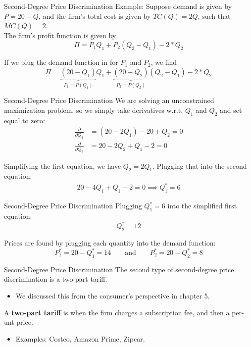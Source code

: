 \documentclass{beamer}
\begin{document}
\begin{frame}{Second-Degree Price Discrimination}
  Example: Suppose demand is given by $P = 20 - Q$, and the firm's total cost is given by $TC(Q)=2Q$, such that $MC(Q)=2$.\\

  The firm's profit function is given by
  $$
    \Pi = P_1 Q_1 + P_2 (Q_2 - Q_1) - 2 * Q_2
  $$

  If we plug the demand function in for $P_1$ and $P_2$, we find
  $$
    \Pi = \underbrace{(20 - Q_1)}_{P_1 = P(Q_1)} Q_1 + \underbrace{(20 - Q_2)}_{P_2 = P(Q_2)} (Q_2 - Q_1) - 2 * Q_2
  $$
\end{frame}

\begin{frame}{Second-Degree Price Discrimination}
  We are solving an unconstrained maximization problem, so we simply take derivatives w.r.t. $Q_1$ and $Q_2$ and set equal to zero:
  \begin{align*}
    \frac{\partial}{\partial Q_1} & = (20 - 2Q_1) - 20 + Q_2 = 0 \\
    \frac{\partial}{\partial Q_2} & = 20 - 2Q_2 + Q_1 - 2 = 0
  \end{align*}

  Simplifying the first equation, we have $Q_2 = 2 Q_1$. Plugging that into the second equation:
  \begin{align*}
    20 - 4Q_1 + Q_1 - 2 = 0 \implies Q_1^* = 6
  \end{align*}
\end{frame}

\begin{frame}{Second-Degree Price Discrimination}
  Plugging $Q_1^* = 6$ into the simplified first equation:
  $$
    Q_2^* = 12
  $$

  \bigskip
  Prices are found by plugging each quantity into the demand function:
  $$
    P_1^* = 20 - Q_1^* = 14 \qquad \text{and} \qquad P_2^* = 20 - Q_2^* = 8
  $$
\end{frame}

\begin{frame}{Second-Degree Price Discrimination}
  The second type of second-degree price discrimination is a two-part tariff.

  \begin{itemize}
    \item We discussed this from the consumer's perspective in chapter 5.
  \end{itemize}

  \bigskip
  A \textbf{two-part tariff} is when the firm charges a subscription fee, and then a per-unt price.

  \begin{itemize}
    \item Examples: Costco, Amazon Prime, Zipcar.
  \end{itemize}
\end{frame}
\end{document}

